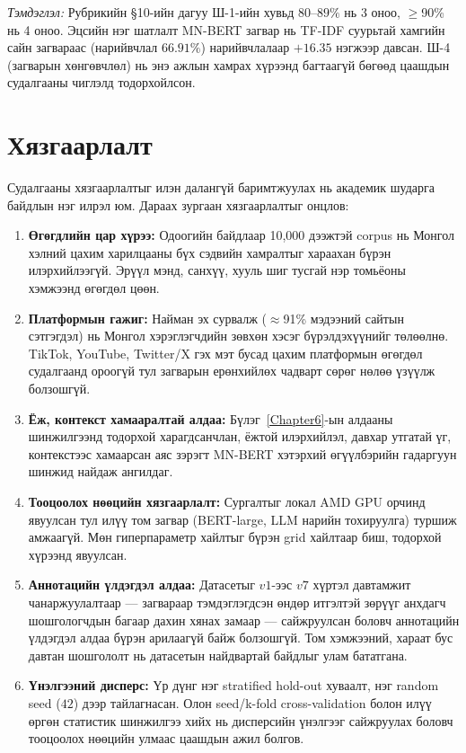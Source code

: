 \textit{Тэмдэглэл:} Рубрикийн §10-ийн дагуу Ш-1-ийн хувьд $80$--$89\%$ нь 3 оноо,
$\geq$90\% нь 4 оноо. Эцсийн нэг шатлалт MN-BERT загвар нь TF-IDF суурьтай
хамгийн сайн загвараас (нарийвчлал $66.91\%$) нарийвчлалаар $+16.35$ нэгжээр
давсан. Ш-4 (загварын хөнгөвчлөл) нь энэ ажлын хамрах хүрээнд багтаагүй бөгөөд
цаашдын судалгааны чиглэлд тодорхойлсон.

\section{Хязгаарлалт}

Судалгааны хязгаарлалтыг илэн далангүй баримтжуулах нь академик шударга байдлын
нэг илрэл юм. Дараах зургаан хязгаарлалтыг онцлов:

\begin{enumerate}
  \item \textbf{Өгөгдлийн цар хүрээ:} Одоогийн байдлаар 10,000 дээжтэй
    corpus нь Монгол хэлний цахим харилцааны бүх сэдвийн хамралтыг хараахан
    бүрэн илэрхийлээгүй. Эрүүл мэнд, санхүү, хууль шиг тусгай нэр томьёоны
    хэмжээнд өгөгдөл цөөн.
  \item \textbf{Платформын гажиг:} Найман эх сурвалж ($\approx$91\% мэдээний сайтын
    сэтгэгдэл) нь Монгол хэрэглэгчдийн зөвхөн хэсэг бүрэлдэхүүнийг төлөөлнө.
    TikTok, YouTube, Twitter/X гэх мэт бусад цахим платформын өгөгдөл
    судалгаанд ороогүй тул загварын ерөнхийлөх чадварт сөрөг нөлөө
    үзүүлж болзошгүй.
  \item \textbf{Ёж, контекст хамааралтай алдаа:} Бүлэг~\ref{Chapter6}-ын алдааны
    шинжилгээнд тодорхой харагдсанчлан, ёжтой илэрхийлэл, давхар утгатай
    үг, контекстээс хамаарсан аяс зэрэгт MN-BERT хэтэрхий өгүүлбэрийн
    гадаргуун шинжид найдаж ангилдаг.
  \item \textbf{Тооцоолох нөөцийн хязгаарлалт:} Сургалтыг локал AMD GPU орчинд
    явуулсан тул илүү том загвар (BERT-large, LLM нарийн тохируулга) туршиж
    амжаагүй. Мөн гиперпараметр хайлтыг бүрэн grid хайлтаар биш, тодорхой
    хүрээнд явуулсан.
  \item \textbf{Аннотацийн үлдэгдэл алдаа:} Датасетыг $v1$-ээс $v7$ хүртэл
    давтамжит чанаржуулалтаар --- загвараар тэмдэглэгдсэн өндөр итгэлтэй
    зөрүүг анхдагч шошгологчдын багаар дахин хянах замаар --- сайжруулсан
    боловч аннотацийн үлдэгдэл алдаа бүрэн арилаагүй байж болзошгүй. Том
    хэмжээний, хараат бус давтан шошгололт нь датасетын найдвартай байдлыг
    улам бататгана.
  \item \textbf{Үнэлгээний дисперс:} Үр дүнг нэг stratified hold-out хуваалт,
    нэг random seed ($42$) дээр тайлагнасан. Олон seed/k-fold cross-validation
    болон илүү өргөн статистик шинжилгээ хийх нь дисперсийн үнэлгээг
    сайжруулах боловч тооцоолох нөөцийн улмаас цаашдын ажил болгов.
\end{enumerate}

